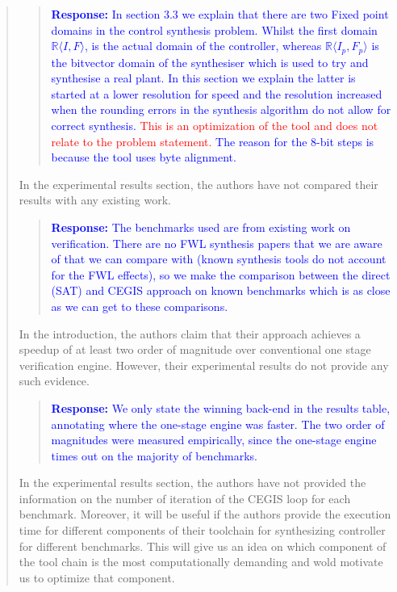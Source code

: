 \documentclass[11pt]{article}
\begin{document}
\begin{quote}
\begin{quote}
\textcolor{blue}{\textbf{Response:} In section 3.3 we explain that there are two Fixed point domains in the control synthesis problem. Whilst the first domain $\mathbb{R}\langle I,F \rangle$, is the actual domain of the controller, whereas $\mathbb{R}\langle I_p,F_p \rangle$ is the bitvector domain of the synthesiser which is used to try and synthesise a real plant. In this section we explain the latter is started at a lower resolution for speed and the resolution increased when the rounding errors in the synthesis algorithm do not allow for correct synthesis. \textcolor{red}{This is an optimization of the tool and does not relate to the problem statement.} The reason for the 8-bit steps is because the tool uses byte alignment.}
\end{quote}

In the experimental results section, the authors have not compared their results with any existing work. 

\begin{quote}
\textcolor{blue}{\textbf{Response:} The benchmarks used are from existing work on verification. There are no FWL synthesis papers that we are aware of that we can compare with (known synthesis tools do not account for the FWL effects), so we make the comparison between the direct (SAT) and CEGIS approach on known benchmarks which is as close as we can get to these comparisons. }
\end{quote}

In the introduction, the authors claim that their approach achieves a speedup of at least two order of magnitude over conventional one stage verification engine. However, their experimental results do not provide any such evidence.

\begin{quote}
\textcolor{blue}{\textbf{Response:} We only state the winning back-end in the
results table, annotating where the one-stage engine was faster. The two order
of magnitudes were measured empirically, since the one-stage engine times out
on the majority of benchmarks.}
\end{quote}

In the experimental results section, the authors have not provided the information on the number of iteration of the CEGIS loop for each benchmark. Moreover, it will be useful if the authors provide the execution time for different components of their toolchain for synthesizing controller for different benchmarks. This will give us an idea on which component of the tool chain is the most computationally demanding and wold motivate us to optimize that component.


\end{quote}
\end{document}
